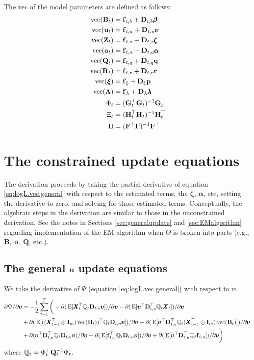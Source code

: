 \documentclass[]{article}
\def\uupsilon{\pmb{\upsilon}}
\def\llambda{\pmb{\lambda}}
\def\bbeta{\pmb{\beta}}
\def\aalpha{\pmb{\alpha}}
\def\zzeta{\pmb{\zeta}}
\def\xixi{\mbox{\boldmath $\xi$}}
\def\LAM{\mbox{\boldmath $\Lambda$}}
\def\ZZ{\mbox{$\mathbf Z$}}	\def\zz{\mbox{$\mathbf z$}}
\def\BB{\mbox{$\mathbf B$}}	\def\bb{\mbox{$\mathbf b$}}
\def\DD{\mbox{$\mathbf D$}}	\def\dd{\mbox{$\mathbf d$}}
\def\FF{\mbox{$\mathbf F$}} \def\ff{\mbox{$\mathbf f$}}
\def\GG{\mbox{$\mathbf G$}}	\def\gg{\mbox{$\mathbf g$}}
\def\HH{\mbox{$\mathbf H$}}	\def\hh{\mbox{$\mathbf h$}}
\def\II{\mbox{$\mathbf I$}} \def\ii{\mbox{$\mathbf i$}}
\def\QQ{\mbox{$\mathbf Q$}}	 \def\qq{\mbox{$\mathbf q$}}
\def\RR{\mbox{$\mathbf R$}}	 \def\rr{\mbox{$\mathbf r$}}
\def\XX{\mbox{$\pmb{X}$}}	\def\xx{\mbox{$\pmb{x}$}}
\def\E{\,\textup{\textrm{E}}}
\def\vec{\,\textup{\textrm{vec}}}
\begin{document}
The vec of the model parameters are defined as follows:
\begin{equation*}
\begin{split}
\vec(\BB_t)&=\ff_{t,b}+\DD_{t,b}\bbeta\\
\vec(\uu_t) &= \ff_{t,u}+\DD_{t,u}\uupsilon\\
\vec(\ZZ_t)&=\ff_{t,z}+\DD_{t,z}\zzeta\\
\vec(\aa_t) &= \ff_{t,a}+\DD_{t,a}\aalpha\\
\vec(\QQ_t)&=\ff_{t,q}+\DD_{t,q}\qq\\
\vec(\RR_t)&=\ff_{t,r}+\DD_{t,r}\rr\\
\vec(\xixi)&=\ff_\xi+\DD_\xi\pp\\
\vec(\LAM)&=\ff_\lambda+\DD_\lambda\llambda\\
\Phi_t&=(\GG_t^\top\GG_t)^{-1}\GG_t^\top\\
\Xi_t&=(\HH_t^\top\HH_t)^{-1}\HH_t^\top\\
\Pi&=(\FF^\top\FF)^{-1}\FF^\top
\end{split}
\end{equation*}

\section{The constrained update equations}\label{sec:constrained}
The derivation proceeds by taking the partial derivative of equation \ref{eq:logL.vec.general} with respect to the estimated terms, the $\zzeta$, $\aalpha$, etc, setting the derivative to zero, and solving for those estimated terms.  Conceptually, the algebraic steps in the derivation are similar to those in  the unconstrained derivation. See the notes in Sections \ref{sec:generalupdate} and \ref{sec:EMalgorithm} regarding implementation of the EM algorithm when $\Theta$ is broken into parts (e.g., $\BB$, $\mbox{$\mathbf u$}$, $\QQ$, etc.).

\subsection{The general $\mbox{$\mathbf u$}$ update equations}
We take the derivative of $\Psi$ (equation \ref{eq:logL.vec.general}) with respect to $\uupsilon$.
\begin{equation}\label{eq:u.general1}
\begin{split}
\partial\Psi/\partial\pmb{\upsilon}
 &= - \frac{1}{2}\sum_{t=1}^T \bigg(-\partial(\E[\XX_t^\top\Qm_t\DD_{t,u}\uupsilon])/\partial\pmb{\upsilon}
 - \partial(\E[\uupsilon^\top\DD_{t,u}^\top\Qm_t\XX_t])/\partial\pmb{\upsilon} \\
&+ \partial(\E[(( \XX_{t-1}^\top \otimes \II_m)\vec(\BB_t))^\top\Qm_t\DD_{t,u}\uupsilon] )/\partial\pmb{\upsilon} 
 + \partial(\E[\uupsilon^\top\DD_{t,u}^\top\Qm_t( \XX_{t-1}^\top \otimes \II_m)\vec(\BB_t)])/\partial\pmb{\upsilon}\\
&+ \partial(\uupsilon^\top\DD_{t,u}^\top\Qm_t\DD_{t,u}\uupsilon)/\partial\pmb{\upsilon} 
+ \partial(\E[\ff_{t,u}^\top\Qm_t\DD_{t,u}\uupsilon])/\partial\pmb{\upsilon}
 + \partial(\E[\uupsilon^\top\DD_{t,u}^\top\Qm_t\ff_{t,u}])/\partial\pmb{\upsilon}
\bigg)
\end{split}
\end{equation}
where $\Qm_t = \Phi_t^\top\QQ_t^{-1}\Phi_t$.
\end{document}
